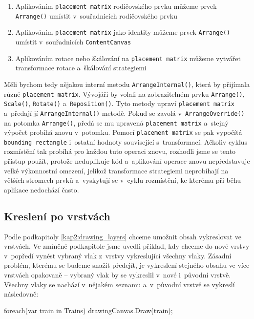 \begin{enumerate}
	\item	Aplikováním \texttt{placement matrix} rodičovského prvku můžeme prvek \newline\texttt{Arrange()} umístit v~souřadnicích rodičovského prvku
	\item	Aplikováním \texttt{placement matrix} jako identity můžeme prvek \texttt{Arrange()} umístit v~souřadnicích \texttt{ContentCanvas}
	\item	Aplikováním rotace nebo škálování na \texttt{placement matrix} můžeme vytvářet transformace rotace a~škálování strategiemi
\end{enumerate}
 
Měli bychom tedy nějakou interní metodu \texttt{ArrangeInternal()}, která by přijímala různé \texttt{placement matrix}. Vývojáři by volali na zobrazitelném prvku \linebreak \texttt{Arrange()}, \texttt{Scale()}, \texttt{Rotate()} a~\texttt{Reposition()}. Tyto metody upraví \texttt{placement matrix} a~předají jí \texttt{ArrangeInternal()} metodě. Pokud se zavolá \linebreak v~\texttt{ArrangeOverride()} na potomka \texttt{Arrange()}, předá se mu upravená \texttt{placement matrix} a~stejný výpočet probíhá znovu v~potomku. Pomocí \texttt{placement matrix} se pak vypočítá \texttt{bounding rectangle} i~ostatní hodnoty související s~transformací. Ačkoliv cyklus rozmístění tak probíhá pro každou tuto operaci znovu, rozhodli jsme se tento přístup použít, protože neduplikuje kód a~aplikování operace znovu nepředstavuje velké výkonnostní omezení, jelikož transformace strategiemi neprobíhají na větších stromech prvků a~vyskytují se v~cyklu rozmístění, ke kterému při běhu aplikace nedochází často.

\newpage
\subsection{Kreslení po vrstvách}
\label{kap3:drawing_layers}
Podle podkapitoly \ref{kap2:drawing_layers} chceme umožnit obsah vykreslovat ve vrstvách. Ve zmíněné podkapitole jsme uvedli příklad, kdy chceme do nové vrstvy v~popředí vynést vybraný vlak z~vrstvy vykreslující všechny vlaky. Zásadní problém, kterému se budeme snažit předejít, je vykreslení stejného obsahu ve více vrstvách opakovaně -- vybraný vlak by se vykreslil v~nové i~původní vrstvě. Všechny vlaky se nachází v~nějakém seznamu a~v~původní vrstvě se vykreslí následovně:

\begin{csharpcode}
foreach(var train in Trains) {
	drawingCanvas.Draw(train);
}
\end{csharpcode}

